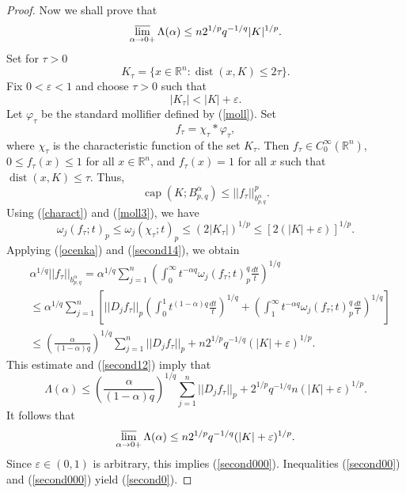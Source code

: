 \documentclass[12pt,twoside,reqno]{amsart}
\numberwithin{equation}{section}
\theoremstyle{definition}
\numberwithin{equation}{section}
\begin{document}
\begin{proof}
Now we shall prove that
\begin{equation}\label{second000}
\varlimsup_{{\alpha}\to 0+}\Lambda({\alpha})\le n2^{1/p}{q^{-1/q}}|K|^{1/p}.
\end{equation}
Set for  $\tau>0$
\begin{equation}\label{second11}
K_{\tau}=\{x\in {\mathbb{R}}^n: {\operatorname{dist}}(x, K)\le 2\tau\}.
\end{equation}
Fix $0<{\varepsilon}<1$ and choose $\tau>0$  such that
\begin{equation}\label{second111}
|K_{\tau}|<|K|+{\varepsilon}.
\end{equation}
 Let $\varphi_\tau$ be the standard
mollifier defined by (\ref{moll}). Set
$$f_{\tau}=\chi_{\tau}\ast{\varphi}_\tau,$$ where $\chi_{\tau}$ is the
characteristic function of the set $K_\tau.$ Then $f_\tau\in
C_0^\infty({\mathbb{R}}^n)$, $0\le f_\tau(x)\le 1$ for all $x\in{\mathbb{R}}^n$, and
$f_\tau(x)=1$ for all $x$ such that $\operatorname{dist} (x,K)\le
\tau.$ Thus,
\begin{equation}\label{second12}
{\operatorname{cap}}(K; B_{p,q}^{\alpha})\le ||f_\tau||_{ b_{p,q}^{\alpha}}^p.
\end{equation}
Using (\ref{charact}) and (\ref{moll3}), we have
\begin{equation}\label{second14}
{\omega}_j(f_\tau;t)_p\le {\omega}_j(\chi_{\tau};t)_p\le (2|K_{\tau}|)^{1/p}\le [2(|K|+{\varepsilon})]^{1/p}.
\end{equation}
Applying (\ref{ocenka}) and (\ref{second14}), we obtain
$$
\begin{aligned}
&{\alpha}^{1/q}||f_\tau||_{b_{p,q}^{\alpha}}= {\alpha}^{1/q}\sum_{j=1}^n\left(\int_0^\infty t^{-{\alpha} q}{\omega}_j(f_\tau;t)_p^q\frac{dt}{t}\right)^{1/q}\\
&\le {\alpha}^{1/q}\sum_{j=1}^n\left[||D_j f_\tau||_p\left(\int_0^1 t^{(1-{\alpha})q}\frac{dt}{t}\right)^{1/q}
+\left(\int_1^\infty t^{-{\alpha} q} {\omega}_j(f_\tau;t)_p^q\frac{dt}{t}\right)^{1/q}\right]\\
&\le \left(\frac{\alpha}{(1-{\alpha})q}\right)^{1/q}\sum_{j=1}^n||D_j f_\tau||_p+n2^{1/p}q^{-1/q}(|K|+{\varepsilon})^{1/p}.
\end{aligned}
$$
This estimate and (\ref{second12}) imply that
$$
\Lambda({\alpha})
\le \left(\frac{\alpha}{(1-{\alpha})q}\right)^{1/q}\sum_{j=1}^n||D_j f_\tau||_p + 2^{1/p}q^{-1/q}n(|K|+{\varepsilon})^{1/p}.
$$
It follows that
$$
\varlimsup_{{\alpha}\to
0+}\Lambda({\alpha}) \le n2^{1/p}q^{-1/q}(|K|+{\varepsilon})^{1/p}.
$$
Since ${\varepsilon}\in (0,1)$ is arbitrary, this implies (\ref{second000}).
Inequalities (\ref{second00}) and (\ref{second000}) yield
(\ref{second0}).
\end{proof}
\end{document}
